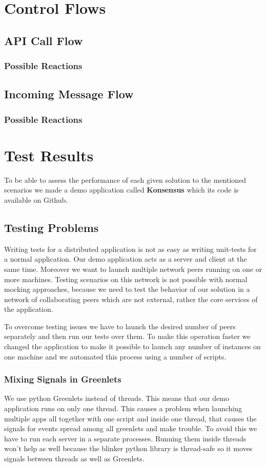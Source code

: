 \section{Control Flows}
\subsection{API Call Flow}
\subsubsection{Possible Reactions}
\subsection{Incoming Message Flow}
\subsubsection{Possible Reactions}


\section{Test Results}
To be able to assess the performance of each given solution to the mentioned scenarios we made a demo application
called \textbf{Konsensus} which its code is available on Github. \cite{konsensus}

\subsection{Testing Problems}
Writing tests for a distributed application is not as easy as writing unit-tests for a normal application. 
Our demo application acts as a server and client at the same time. Moreover we want to launch multiple 
network peers running on one or more machines. Testing scenarios on this network is not possible with
normal mocking approaches, because we need to test the behavior of our solution in a network of collaborating
peers which are not external, rather the core services of the application.

To overcome testing issues we have to launch the desired number of peers separately and then run our tests 
over them. To make this operation faster we changed the application to make it possible to launch any number
of instances on one machine and we automated this process using a number of scripts. %

\subsubsection{Mixing Signals in Greenlets}
We use python Greenlets instead of threads. This means that our demo application runs on only one thread. 
This causes a problem when launching multiple apps all together with one script and inside one thread, that
causes the signals for events spread among all greenlets and make trouble. To avoid this we have to run
each server in a separate processes. Running them inside threads won't help as well because the blinker python
library is thread-safe so it moves signals between threads as well as Greenlets.

